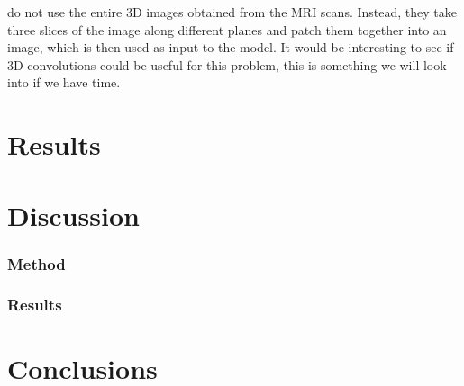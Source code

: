 \documentclass{kththesis}
\begin{document}
\textcite{islam2018early} do not use the entire 3D images obtained from the MRI scans. Instead, they take three slices of the image along different planes and patch them together into an image, which is then used as input to the model. It would be interesting to see if 3D convolutions could be useful for this problem, this is something we will look into if we have time.

\chapter{Results}

\chapter{Discussion}
\subsection{Method}
\subsection{Results}

\chapter{Conclusions}

\printbibliography[heading=bibintoc]

\appendix


\tailmatter
\end{document}
